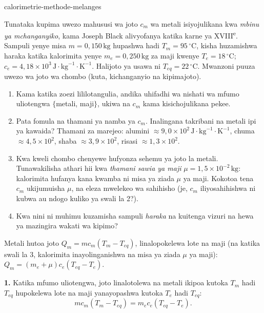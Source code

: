 \begin{exo}{calorimetrie-methode-melanges}

Tunataka kupima uwezo mahususi wa joto $c_m$ wa metali isiyojulikana kwa \emph{mbinu ya mchanganyiko}, kama Joseph Black alivyofanya katika karne ya XVIII\textsuperscript{e}. Sampuli yenye misa $m=0{,}150\,\text{kg}$ hupashwa hadi $T_m=95\,{}^\circ\text{C}$, kisha huzamishwa haraka katika kalorimita yenye $m_e=0{,}250\,\text{kg}$ za maji kwenye $T_e=18\,{}^\circ\text{C}$; $c_e=4{,}18\times10^3\,\text{J}\!\cdot\!\text{kg}^{-1}\!\cdot\!\text{K}^{-1}$. Halijoto ya usawa ni $T_{eq}=22\,{}^\circ\text{C}$. Mwanzoni puuza uwezo wa joto wa chombo (kuta, kichanganyio na kipimajoto).

\begin{enumerate}
  \item Kama katika zoezi lililotangulia, andika uhifadhi wa nishati wa mfumo uliotengwa $\{$metali, maji$\}$, ukiwa na $c_m$ kama kisichojulikana pekee.
  \item Pata fomula na thamani ya namba ya $c_m$. Inalingana takribani na metali ipi ya kawaida? Thamani za marejeo: alumini $\approx9{,}0\times10^2\,\text{J}\!\cdot\!\text{kg}^{-1}\!\cdot\!\text{K}^{-1}$, chuma $\approx4{,}5\times10^2$, shaba $\approx3{,}9\times10^2$, risasi $\approx1{,}3\times10^2$.
  \item Kwa kweli chombo chenyewe hufyonza sehemu ya joto la metali. Tunawakilisha athari hii kwa \emph{thamani sawia ya maji} $\mu=1{,}5\times10^{-2}\,\text{kg}$: kalorimita hufanya kana kwamba ni misa ya ziada $\mu$ ya maji. Kokotoa tena $c_m$ ukijumuisha $\mu$, na eleza mwelekeo wa sahihisho (je, $c_m$ iliyosahihishwa ni kubwa au ndogo kuliko ya swali la 2?).
  \item Kwa nini ni muhimu kuzamisha sampuli \emph{haraka} na kuitenga vizuri na hewa ya mazingira wakati wa kipimo?
\end{enumerate}

\begin{indication}
Metali hutoa joto $Q_m=mc_m(T_m-T_{eq})$, linalopokelewa lote na maji (na katika swali la 3, kalorimita inayolinganishwa na misa ya ziada $\mu$ ya maji): $Q_m=(m_e+\mu)c_e(T_{eq}-T_e)$.
\end{indication}

\begin{solution}
\textbf{1.} Katika mfumo uliotengwa, joto linalotolewa na metali ikipoa kutoka $T_m$ hadi $T_{eq}$ hupokelewa lote na maji yanayopashwa kutoka $T_e$ hadi $T_{eq}$:
\[
mc_m(T_m-T_{eq})=m_ec_e(T_{eq}-T_e).
\]


\end{solution}
\end{exo}
